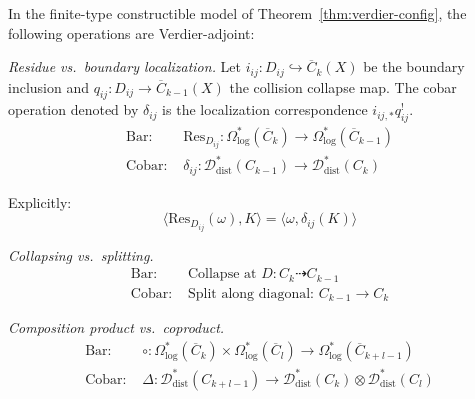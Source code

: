 \begin{theorem}\label{thm:dual-differentials}
In the finite-type constructible model of
Theorem~\ref{thm:verdier-config}, the following operations are
Verdier-adjoint:

\emph{Residue vs.\ boundary localization.}
Let $i_{ij}\colon D_{ij}\hookrightarrow\overline{C}_k(X)$ be the
boundary inclusion and
$q_{ij}\colon D_{ij}\to\overline{C}_{k-1}(X)$ the collision
collapse map. The cobar operation denoted by $\delta_{ij}$ is the
localization correspondence $i_{ij,*}q_{ij}^{!}$.
\begin{align*}
\text{Bar: } &\text{Res}_{D_{ij}}: \Omega^*_{\log}(\overline{C}_k) \to \Omega^*_{\log}(\overline{C}_{k-1})\\
\text{Cobar: } &\delta_{ij}: \mathcal{D}^*_{\text{dist}}(C_{k-1}) \to \mathcal{D}^*_{\text{dist}}(C_k)
\end{align*}

Explicitly:
\[\langle \text{Res}_{D_{ij}}(\omega), K \rangle = \langle \omega, \delta_{ij}(K) \rangle\]

\emph{Collapsing vs.\ splitting.}
\begin{align*}
\text{Bar: } &\text{Collapse at } D: C_k \dashrightarrow C_{k-1}\\
\text{Cobar: } &\text{Split along diagonal: } C_{k-1} \to C_k
\end{align*}

\emph{Composition product vs.\ coproduct.}
\begin{align*}
\text{Bar: } &\circ: \Omega^*_{\log}(\overline{C}_k) \times \Omega^*_{\log}(\overline{C}_l) \to \Omega^*_{\log}(\overline{C}_{k+l-1})\\
\text{Cobar: } &\Delta: \mathcal{D}^*_{\text{dist}}(C_{k+l-1}) \to \mathcal{D}^*_{\text{dist}}(C_k) \otimes \mathcal{D}^*_{\text{dist}}(C_l)
\end{align*}
\end{theorem}

